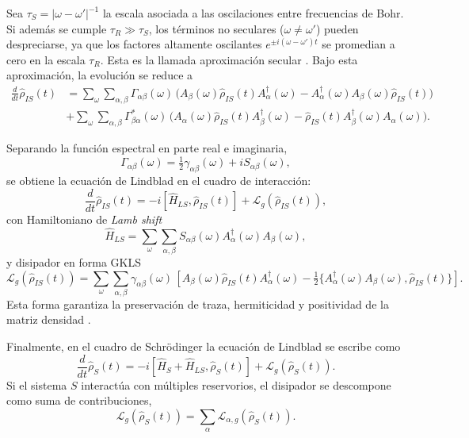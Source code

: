 Sea $\tau_{S}=|\omega-\omega'|^{-1}$ la escala asociada a las oscilaciones entre frecuencias de Bohr. Si además se cumple $\tau_{R}\gg \tau_{S}$, los términos no seculares ($\omega\neq\omega'$) pueden despreciarse, ya que los factores altamente oscilantes $e^{\pm i(\omega-\omega')t}$ se promedian a cero en la escala $\tau_{R}$. Esta es la llamada aproximación secular \cite{breuer2002theory}. Bajo esta aproximación, la evolución se reduce a
\begin{align*}
    \frac{d}{dt}\hat{\rho}_{IS}(t) &=
    \sum_{\omega}\sum_{\alpha,\beta} \Gamma_{\alpha\beta}(\omega)\,
    \Big(A_{\beta}(\omega)\hat{\rho}_{IS}(t)A_{\alpha}^{\dagger}(\omega)
        - A_{\alpha}^{\dagger}(\omega)A_{\beta}(\omega)\hat{\rho}_{IS}(t)\Big) \\
    &+ \sum_{\omega}\sum_{\alpha,\beta} \Gamma^{*}_{\beta\alpha}(\omega)\,
    \Big(A_{\alpha}(\omega)\hat{\rho}_{IS}(t)A_{\beta}^{\dagger}(\omega)
        - \hat{\rho}_{IS}(t)A_{\beta}^{\dagger}(\omega)A_{\alpha}(\omega)\Big).
\end{align*}

Separando la función espectral en parte real e imaginaria,
\begin{equation*}
    \Gamma_{\alpha\beta}(\omega) = \tfrac{1}{2}\gamma_{\alpha\beta}(\omega) + iS_{\alpha\beta}(\omega),
\end{equation*}
se obtiene la ecuación de Lindblad en el cuadro de interacción:
\begin{equation}
    \frac{d}{dt}\hat{\rho}_{IS}(t) = -i[\hat{H}_{LS}, \hat{\rho}_{IS}(t)] + \mathcal{L}_{g}(\hat{\rho}_{IS}(t)),
    \label{seclindbladfinal}
\end{equation}
con Hamiltoniano de \emph{Lamb shift}
\begin{equation*}
    \hat{H}_{LS} = \sum_{\omega}\sum_{\alpha,\beta} S_{\alpha\beta}(\omega)A_{\alpha}^{\dagger}(\omega)A_{\beta}(\omega),
\end{equation*}
y disipador en forma GKLS
\begin{equation*}
    \mathcal{L}_{g}(\hat{\rho}_{IS}(t)) = \sum_{\omega}\sum_{\alpha,\beta} \gamma_{\alpha\beta}(\omega)\,
    \left[A_{\beta}(\omega)\hat{\rho}_{IS}(t)A_{\alpha}^{\dagger}(\omega) - \tfrac{1}{2}\{A_{\alpha}^{\dagger}(\omega)A_{\beta}(\omega), \hat{\rho}_{IS}(t)\}\right].
\end{equation*}
Esta forma garantiza la preservación de traza, hermiticidad y positividad de la matriz densidad \cite{manzano2020short}.

Finalmente, en el cuadro de Schrödinger la ecuación de Lindblad se escribe como
\begin{equation}
    \frac{d}{dt}\hat{\rho}_{S}(t) = -i[\hat{H}_{S}+\hat{H}_{LS}, \hat{\rho}_{S}(t)] + \mathcal{L}_{g}(\hat{\rho}_{S}(t)).
    \label{eqsec2:lindbladS}
\end{equation}
Si el sistema $S$ interactúa con múltiples reservorios, el disipador se descompone como suma de contribuciones,
\begin{equation*}
    \mathcal{L}_{g}(\hat{\rho}_{S}(t)) = \sum_{\alpha}\mathcal{L}_{\alpha,g}(\hat{\rho}_{S}(t)).
\end{equation*}

